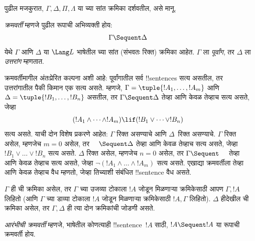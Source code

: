 \documentclass[../../../include/open-logic-section]{subfiles}
\begin{document}
      {}
      {}


पुढील मजकुरात, $\Gamma, \Delta, \Pi, \Lambda$ या च्या सांत
क्रमिका दर्शवतील, असे मानू.

\begin{defn}[क्रमवर्ती]
\emph{क्रमवर्ती} म्हणजे पुढील रूपाची अभिव्यक्ती होय:
\[
\Gamma \Sequent \Delta
\]
येथे $\Gamma$ आणि $\Delta$ या $\Lang L$ भाषेतील च्या
सांत (संभवतः रिक्त) क्रमिका आहेत. $\Gamma$ ला \emph{पूर्वांग}, तर
$\Delta$ ला \emph{उत्तरांग} म्हणतात.
\end{defn}

\begin{explain}
क्रमवर्तीमागील अंतःप्रेरित कल्पना अशी आहे: पूर्वांगातील सर्व !!{sentence}s
सत्य असतील, तर उत्तरांगातील पैकी किमान एक सत्य असते. म्हणजे,
$\Gamma = \tuple{!A_1, \dots, !A_m}$ आणि
$\Delta = \tuple{!B_1, \dots, !B_n}$ असतील, तर $\Gamma \Sequent \Delta$
तेव्हा आणि केवळ तेव्हाच सत्य असते, जेव्हा
\[
(!A_1 \land \cdots \land !A_m) \lif (!B_1 \lor \cdots \lor
!B_n)
\]
सत्य असते. याची दोन विशेष प्रकरणे आहेत: $\Gamma$ रिक्त असण्याचे आणि
$\Delta$~रिक्त असण्याचे. $\Gamma$ रिक्त असेल, म्हणजेच $m = 0$ असेल, तर
$\quad \Sequent \Delta$ तेव्हा आणि केवळ तेव्हाच सत्य असते, जेव्हा
$!B_1 \lor \dots \lor !B_n$ सत्य असते. $\Delta$ रिक्त असेल, म्हणजेच
$n = 0$ असेल, तर $\Gamma \Sequent \quad$ तेव्हा आणि केवळ तेव्हाच सत्य
असते, जेव्हा $\lnot(!A_1 \land \dots \land !A_m)$ सत्य असते. एखाद्या
क्रमवर्तीला तेव्हा आणि केवळ तेव्हाच वैध म्हणतो, जेव्हा तिच्याशी संबंधित
!!{sentence} वैध असते.
\end{explain}

$\Gamma$ ही ची क्रमिका असेल, तर $\Gamma$ च्या उजव्या टोकाला
$!A$ जोडून मिळणाऱ्या क्रमिकेसाठी आपण $\Gamma, !A$ लिहितो (आणि $\Gamma$
च्या डाव्या टोकाला $!A$ जोडून मिळणाऱ्या क्रमिकेसाठी $!A, \Gamma$
लिहितो). $\Delta$ हीदेखील ची क्रमिका असेल, तर $\Gamma,
\Delta$ ही त्या दोन क्रमिकांची जोडणी असते.

\begin{defn}[आरंभीची क्रमवर्ती]
\emph{आरंभीची क्रमवर्ती} म्हणजे, भाषेतील कोणत्याही !!{sentence}~$!A$ साठी,
{$!A \Sequent !A$ या रूपाची क्रमवर्ती होय.}
\end{defn}
\end{document}
